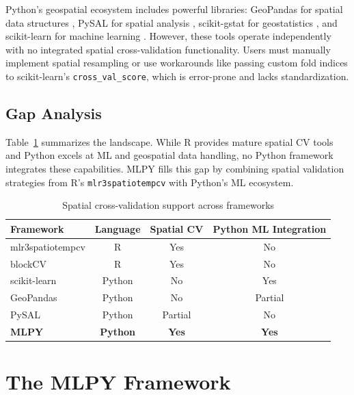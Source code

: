 \documentclass[a4paper,fleqn]{cas-sc}
\begin{document}
Python's geospatial ecosystem includes powerful libraries: GeoPandas for spatial data structures \citep{kelsey2020geopandas}, PySAL for spatial analysis \citep{rey2010pysal}, scikit-gstat for geostatistics \citep{malicke2021scikit}, and scikit-learn for machine learning \citep{pedregosa2011scikit}. However, these tools operate independently with no integrated spatial cross-validation functionality. Users must manually implement spatial resampling or use workarounds like passing custom fold indices to scikit-learn's \texttt{cross\_val\_score}, which is error-prone and lacks standardization.

\subsection{Gap Analysis}

Table~\ref{tab:gap} summarizes the landscape. While R provides mature spatial CV tools and Python excels at ML and geospatial data handling, no Python framework integrates these capabilities. MLPY fills this gap by combining spatial validation strategies from R's \texttt{mlr3spatiotempcv} with Python's ML ecosystem.

\begin{table}
\centering
\caption{Spatial cross-validation support across frameworks}
\label{tab:gap}
\begin{tabular}{lccc}
\toprule
Framework & Language & Spatial CV & Python ML Integration \\
\midrule
mlr3spatiotempcv & R & Yes & No \\
blockCV & R & Yes & No \\
scikit-learn & Python & No & Yes \\
GeoPandas & Python & No & Partial \\
PySAL & Python & Partial & No \\
\textbf{MLPY} & \textbf{Python} & \textbf{Yes} & \textbf{Yes} \\
\bottomrule
\end{tabular}
\end{table}


\section{The MLPY Framework}
\label{sec:framework}
\end{document}

